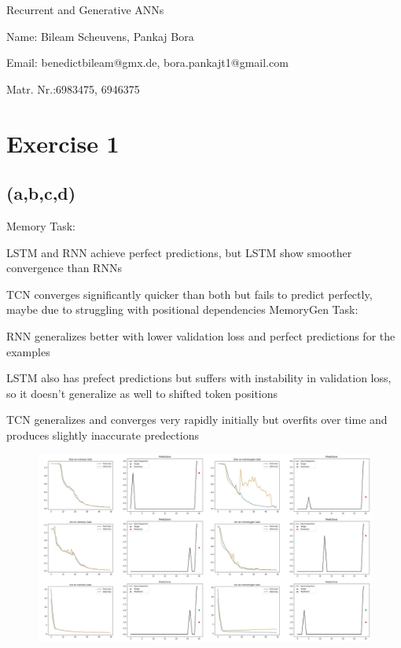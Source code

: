 \documentclass[11pt]{article}
\numberwithin{equation}{section}
\begin{document}
\begin{center}
    \sc Recurrent and Generative ANNs
\end{center}

\noindent Name: Bileam Scheuvens, Pankaj Bora

\noindent Email: benedictbileam@gmx.de, bora.pankajt1@gmail.com

\noindent Matr. Nr.:6983475, 6946375



\section*{Exercise 1}
\subsection*{(a,b,c,d)}
Memory Task:


LSTM and RNN achieve perfect predictions, but LSTM show smoother convergence than RNNs


TCN converges significantly quicker than both but fails to predict perfectly, maybe due to struggling with positional dependencies
\newline
\newline
MemoryGen Task:


RNN generalizes better with lower validation loss and perfect predictions for the examples


LSTM also has prefect predictions but suffers with instability in validation loss, so it doesn't generalize as well to shifted token positions


TCN generalizes and converges very rapidly initially but overfits over time and produces slightly inaccurate predections

\newline

\begin{figure}[H]
  \centering %
  \includegraphics[width=1.1\textwidth]{imageAll.jpg} %
\end{figure}
\end{document}
